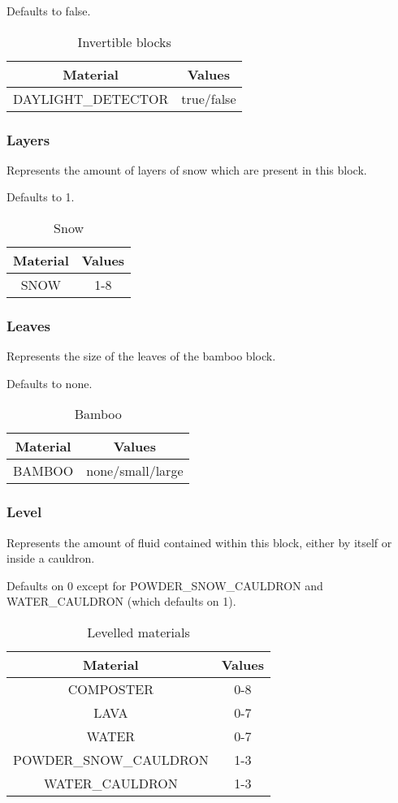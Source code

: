 Defaults to false.

\begin{table}[H]
	\centering
	\begin{tabular}{ |c|c| }
		\hline
		Material & Values \\
		\hline
		DAYLIGHT\_DETECTOR & true/false \\
		\hline
	\end{tabular}
	\caption{Invertible blocks}
\end{table}

\subsubsection{Layers}
Represents the amount of layers of snow which are present in this block.

Defaults to 1.

\begin{table}[H]
	\centering
	\begin{tabular}{ |c|c| }
		\hline
		Material & Values \\
		\hline
		SNOW & 1-8 \\
		\hline
	\end{tabular}
	\caption{Snow}
\end{table}

\subsubsection{Leaves}
Represents the size of the leaves of the bamboo block.

Defaults to none.

\begin{table}[H]
	\centering
	\begin{tabular}{ |c|c| }
		\hline
		Material & Values \\
		\hline
		BAMBOO & none/small/large \\
		\hline
	\end{tabular}
	\caption{Bamboo}
\end{table}

\subsubsection{Level}
Represents the amount of fluid contained within this block, either by itself or inside a cauldron.

Defaults on 0 except for POWDER\_SNOW\_CAULDRON and WATER\_CAULDRON (which defaults on 1).

\begin{table}[H]
	\centering
	\begin{tabular}{ |c|c| }
		\hline
		Material & Values \\
		\hline
		COMPOSTER & 0-8 \\
		LAVA & 0-7 \\
		WATER & 0-7 \\
		POWDER\_SNOW\_CAULDRON & 1-3 \\
		WATER\_CAULDRON & 1-3 \\
		\hline
	\end{tabular}
	\caption{Levelled materials}
\end{table}

